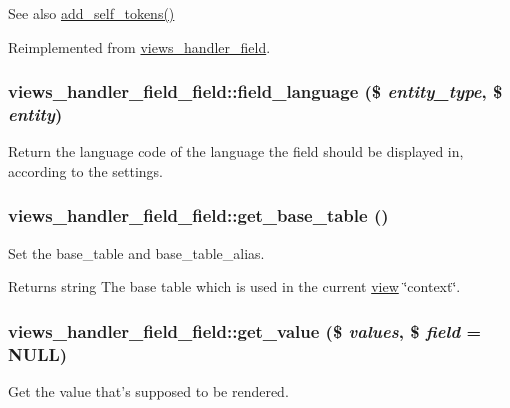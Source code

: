 \begin{DoxySeeAlso}{See also}
\hyperlink{classviews__handler__field__field_a188044611e725e210d9b538b5b91f0c9}{add\_\-self\_\-tokens()} 
\end{DoxySeeAlso}


Reimplemented from \hyperlink{classviews__handler__field_ae33446d1059f13fbfb06a37da04d320e}{views\_\-handler\_\-field}.\hypertarget{classviews__handler__field__field_a1c0592717f7babeb9adf9c9e3193024b}{
\subsubsection[{field\_\-language}]{\setlength{\rightskip}{0pt plus 5cm}views\_\-handler\_\-field\_\-field::field\_\-language (\$ {\em entity\_\-type}, \/  \$ {\em entity})}}
\label{classviews__handler__field__field_a1c0592717f7babeb9adf9c9e3193024b}
Return the language code of the language the field should be displayed in, according to the settings. \hypertarget{classviews__handler__field__field_a06b5818f58f0a9edaeadc085186eb2a6}{
\subsubsection[{get\_\-base\_\-table}]{\setlength{\rightskip}{0pt plus 5cm}views\_\-handler\_\-field\_\-field::get\_\-base\_\-table ()}}
\label{classviews__handler__field__field_a06b5818f58f0a9edaeadc085186eb2a6}
Set the base\_\-table and base\_\-table\_\-alias.

\begin{DoxyReturn}{Returns}
string The base table which is used in the current \hyperlink{classview}{view} \char`\"{}context\char`\"{}. 
\end{DoxyReturn}
\hypertarget{classviews__handler__field__field_a0f3c7e4a7197b2cc7d06e5a489012a8a}{
\subsubsection[{get\_\-value}]{\setlength{\rightskip}{0pt plus 5cm}views\_\-handler\_\-field\_\-field::get\_\-value (\$ {\em values}, \/  \$ {\em field} = {\ttfamily NULL})}}
\label{classviews__handler__field__field_a0f3c7e4a7197b2cc7d06e5a489012a8a}
Get the value that's supposed to be rendered.

